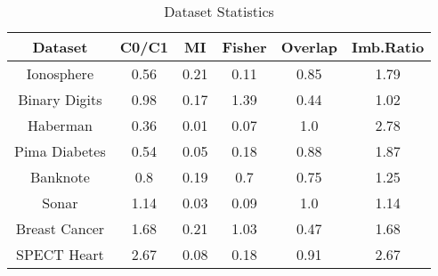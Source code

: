 \begin{table}[htbp]
\caption{Dataset Statistics}
\begin{center}
\begin{tabular}{|c|c|c|c|c|c|}
\hline
\textbf{Dataset} & \textbf{C0/C1} & \textbf{MI} & \textbf{Fisher} & \textbf{Overlap} & \textbf{Imb.Ratio} \\ \hline
Ionosphere & 0.56 & 0.21 & 0.11 & 0.85 & 1.79 \\ \hline
Binary Digits & 0.98 & 0.17 & 1.39 & 0.44 & 1.02 \\ \hline
Haberman & 0.36 & 0.01 & 0.07 & 1.0 & 2.78 \\ \hline
Pima Diabetes & 0.54 & 0.05 & 0.18 & 0.88 & 1.87 \\ \hline
Banknote & 0.8 & 0.19 & 0.7 & 0.75 & 1.25 \\ \hline
Sonar & 1.14 & 0.03 & 0.09 & 1.0 & 1.14 \\ \hline
Breast Cancer & 1.68 & 0.21 & 1.03 & 0.47 & 1.68 \\ \hline
SPECT Heart & 2.67 & 0.08 & 0.18 & 0.91 & 2.67 \\ \hline
\end{tabular}
\label{tab:statistics}
\end{center}
\end{table}